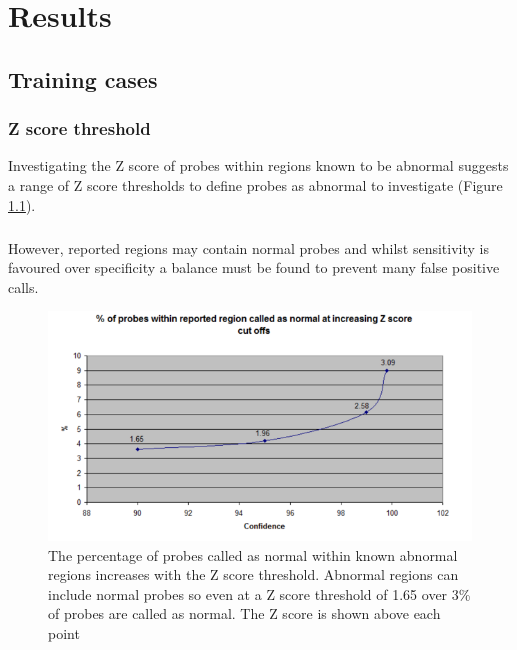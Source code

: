 \chapter{Results}\label{ch:Results} 
\section{Training cases}
\subsection{Z score threshold}
Investigating the Z score of probes within regions known to be abnormal suggests a range of Z score thresholds to define probes as abnormal  to investigate (Figure \ref{fig:probeswithinreportedregion}). 
\paragraph*{}
However, reported regions may contain normal probes and whilst sensitivity is favoured over specificity a balance must be found to prevent many false positive calls.

\begin{figure}[h]
\centering
\includegraphics[width=1\linewidth]{./Figures/probeswithinreportedregion}
\caption[The number of probes classified as normal within known regions of CNV at a range of Z score thresholds]{The percentage of probes called as normal within known abnormal regions increases with the Z score threshold. Abnormal regions can include normal probes so even at a Z score threshold of 1.65 over 3\% of probes are called as normal. The Z score is shown above each point}
\label{fig:probeswithinreportedregion}
\end{figure}


